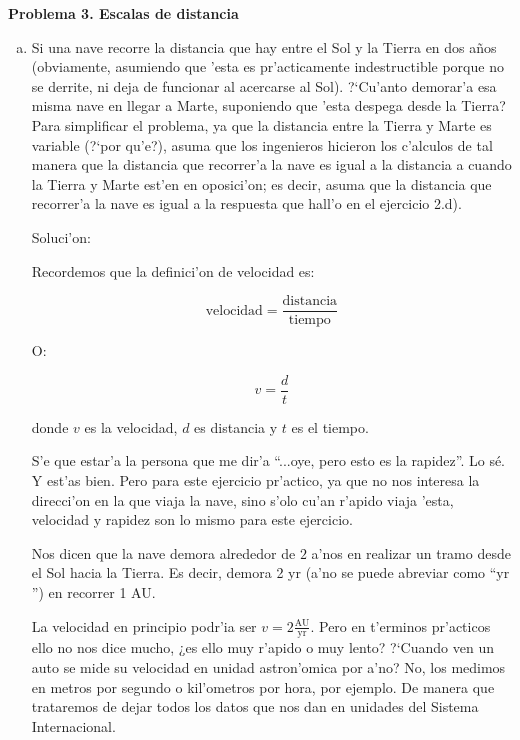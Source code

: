 \documentclass{article}
\begin{document}
\vspace{4mm}

\textbf{Problema 3. Escalas de distancia}

\vspace{2mm}

\begin{enumerate} [a)]
\item Si una nave recorre la distancia que hay entre el Sol y la Tierra en dos años (obviamente, asumiendo que 'esta es pr'acticamente indestructible porque no se derrite, ni deja de funcionar al acercarse al Sol). ?`Cu'anto demorar'a esa misma nave en llegar a Marte, suponiendo que 'esta despega desde la Tierra? Para simplificar el problema, ya que la distancia entre la Tierra y Marte es variable (?`por qu'e?), asuma que los ingenieros hicieron los c'alculos de tal manera que la distancia que recorrer'a la nave es igual a la distancia a cuando la Tierra y Marte est'en en oposici'on; es decir, asuma que la distancia que recorrer'a la nave es igual a la respuesta que hall'o en el ejercicio 2.d).

\vspace{2mm}

Soluci'on:

Recordemos que la definici'on de velocidad es:

\begin{equation}
\text{velocidad} = \frac{\text{distancia}}{\text{tiempo}}
\end{equation}

O:

\begin{equation}\label{velocidad}
v = \frac{d}{t}
\end{equation}

donde $v$ es la velocidad, $d$ es distancia y $t$ es el tiempo.

S'e que estar'a la persona que me dir'a ``...oye, pero esto es la rapidez''. Lo sé. Y est'as bien. Pero para este ejercicio pr'actico, ya que no nos interesa la direcci'on en la que viaja la nave, sino s'olo cu'an r'apido viaja 'esta, velocidad y rapidez son lo mismo para este ejercicio.

Nos dicen que la nave demora alrededor de $2$ a'nos en realizar un tramo desde el Sol hacia la Tierra. Es decir, demora 2 yr (a'no se puede abreviar como ``$\text{yr}$'') en recorrer 1 AU.

La velocidad en principio podr'ia ser $v = 2 \frac{\text{AU}}{\text{yr}}$. Pero en t'erminos pr'acticos ello no nos dice mucho, ¿es ello muy r'apido o muy lento? ?`Cuando ven un auto se mide su velocidad en unidad astron'omica por a'no? No, los medimos en metros por segundo o kil'ometros por hora, por ejemplo. De manera que trataremos de dejar todos los datos que nos dan en unidades del Sistema Internacional. 


\end{enumerate}
\end{document}
